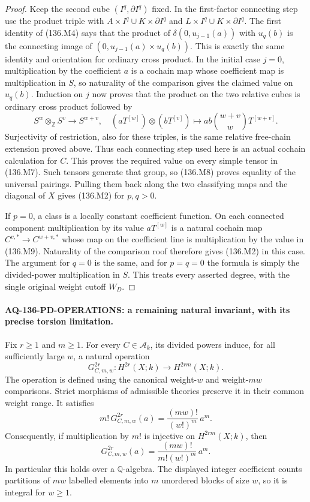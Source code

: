 \begin{proof}
Keep the second cube $(I^q,\partial I^q)$ fixed.
In the first-factor connecting step use the product
triple with
$A\times I^q\cup K\times\partial I^q$ and
$L\times I^q\cup K\times\partial I^q$.
The first identity of (136.M4) says that the product
of $\delta(0,u_{j-1}(a))$ with $u_q(b)$ is the
connecting image of
$(0,u_{j-1}(a)\mathbin{\times}u_q(b))$.
This is exactly the same identity and orientation
for ordinary cross product. In the initial case
$j=0$, multiplication by the coefficient $a$ is a
cochain map whose coefficient map is multiplication
in $S$, so naturality of the comparison gives the
claimed value on $u_q(b)$. Induction on $j$ now
proves that the product on the two relative cubes
is ordinary cross product followed by
\[
 S^w\otimes_{\mathbb Z}S^v\longrightarrow S^{w+v},
 \quad (aT^{[w]})\otimes(bT^{[v]})
       \longmapsto ab\binom{w+v}{w}T^{[w+v]}.
                                                               \tag{136.M9}
\]
Surjectivity of restriction, also for these triples,
is the same relative free-chain extension proved
above. Thus each connecting step used here is an
actual cochain calculation for $C$. This proves the required value
on every simple tensor in (136.M7). Such tensors
generate that group, so (136.M8) proves equality of
the universal pairings. Pulling them back along the
two classifying maps and the diagonal of $X$ gives
(136.M2) for $p,q>0$.

If $p=0$, a class is a locally constant coefficient
function. On each connected component multiplication
by its value $aT^{[w]}$ is a natural cochain map
$C^{v,*}\to C^{w+v,*}$ whose map on the coefficient
line is multiplication by the value in (136.M9).
Naturality of the comparison roof therefore gives
(136.M2) in this case. The argument for $q=0$ is
the same, and for $p=q=0$ the formula is simply
the divided-power multiplication in $S$. This treats
every asserted degree, with the single original
weight cutoff $W_D$.
\end{proof}

\paragraph{AQ-136-PD-OPERATIONS: a remaining natural invariant, with its precise torsion limitation.}
Fix $r\ge1$ and $m\ge1$. For every $C\in\mathcal A_k$,
its divided powers induce, for all sufficiently large
$w$, a natural operation
\[
 G_{C,m,w}^{2r}:H^{2r}(X;k)\longrightarrow H^{2rm}(X;k).
                                                               \tag{136.PD1}
\]
The operation is defined using the canonical weight-$w$
and weight-$mw$ comparisons. Strict morphisms of
admissible theories preserve it in their common weight
range. It satisfies
\[
 m!\,G_{C,m,w}^{2r}(a)
       =\frac{(mw)!}{(w!)^m}\,a^m.
                                                               \tag{136.PD2}
\]
Consequently, if multiplication by $m!$ is injective on
$H^{2rm}(X;k)$, then
\[
 G_{C,m,w}^{2r}(a)
       =\frac{(mw)!}{m!(w!)^m}\,a^m.
                                                               \tag{136.PD3}
\]
In particular this holds over a $\mathbb Q$-algebra.
The displayed integer coefficient counts partitions of
$mw$ labelled elements into $m$ unordered blocks of
size $w$, so it is integral for $w\ge1$.

